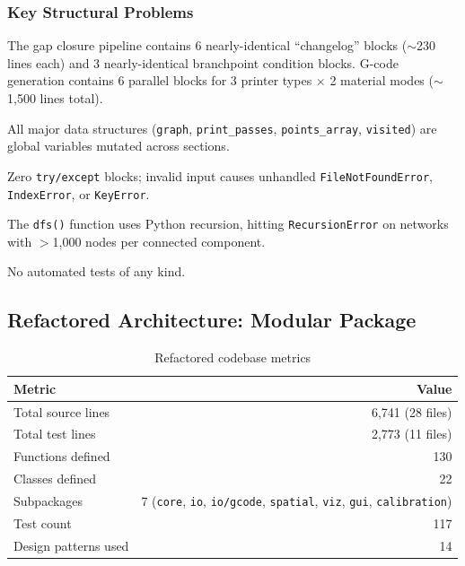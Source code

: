 \documentclass[11pt,a4paper]{article}
\begin{document}
\subsubsection{Key Structural Problems}

\begin{description}[leftmargin=2em]
    \item[Massive duplication:] The gap closure pipeline contains 6 nearly-identical ``changelog'' blocks ($\sim$230 lines each) and 3 nearly-identical branchpoint condition blocks. G-code generation contains 6 parallel blocks for 3 printer types $\times$ 2 material modes ($\sim$1,500 lines total).
    \item[Global mutable state:] All major data structures (\texttt{graph}, \texttt{print\_passes}, \texttt{points\_array}, \texttt{visited}) are global variables mutated across sections.
    \item[No error handling:] Zero \texttt{try/except} blocks; invalid input causes unhandled \texttt{FileNotFoundError}, \texttt{IndexError}, or \texttt{KeyError}.
    \item[Recursive DFS:] The \texttt{dfs()} function uses Python recursion, hitting \texttt{RecursionError} on networks with $>$1,000 nodes per connected component.
    \item[No tests:] No automated tests of any kind.
\end{description}

\subsection{Refactored Architecture: Modular Package}

\begin{table}[H]
\centering
\caption{Refactored codebase metrics}
\begin{tabular}{lr}
\toprule
\textbf{Metric} & \textbf{Value} \\
\midrule
Total source lines & 6,741 (28 files) \\
Total test lines & 2,773 (11 files) \\
Functions defined & 130 \\
Classes defined & 22 \\
Subpackages & 7 (\texttt{core}, \texttt{io}, \texttt{io/gcode}, \texttt{spatial}, \texttt{viz}, \texttt{gui}, \texttt{calibration}) \\
Test count & 117 \\
Design patterns used & 14 \\
\bottomrule
\end{tabular}
\end{table}
\end{document}
